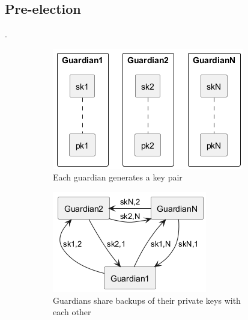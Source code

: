 \subsection{Pre-election}. 
\begin{figure}[h!]
    \centering
    \begin{subfigure}{0.3\textwidth}
        \centering
        \includegraphics[width=\textwidth]{abbildungen/Diagramme/keyceremony1.png}
        \caption{Each guardian generates a key pair}
        \label{fig:keypair}
    \end{subfigure}
    \hfill
    \begin{subfigure}{0.3\textwidth}
        \centering
        \includegraphics[width=\textwidth]{abbildungen/Diagramme/keyceremony2.png}
        \caption{Guardians share backups of their private keys with each other}
        \label{fig:backup}
    \end{subfigure}
    \hfill
    \begin{subfigure}{0.3\textwidth}

\end{subfigure}
\end{figure}
